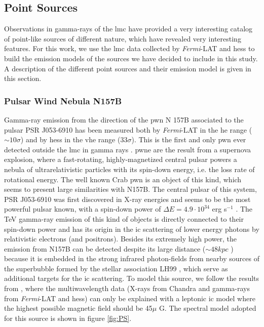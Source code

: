 \documentclass[main.tex]{subfiles}
\begin{document}
\subsection{Point Sources}

Observations in gamma-rays of the \gls{lmc} have provided a very interesting catalog of point-like sources of different nature, which have revealed very interesting features. For this work, we use the \gls{lmc} data collected by \textit{Fermi}-LAT \cite{2010FermiLATLMC11months} \cite{2016LMCFermiLAT} and \gls{hess} \cite{2012HESSLMC} \cite{2015HESSTeVLMC} \cite{2017HESSLMCP3} to build the emission models of the sources we have decided to include in this study. A description of the different point sources and their emission model is given in this section.

\subsubsection{Pulsar Wind Nebula N157B}

Gamma-ray emission from the direction of the \gls{pwn} N 157B associated to the pulsar  PSR J053-6910 has been measured both by \textit{Fermi}-LAT in the \gls{he} range ($\sim 10 \sigma$) and by \gls{hess} in the \gls{vhe} range ($33 \sigma$). This is the first and only \gls{pwn} ever detected outside the \gls{lmc} in gamma rays \cite{2012HESSN157B}. \gls{pwne} are the result from  a supernova explosion, where a fast-rotating, highly-magnetized central pulsar powers a nebula of ultrarelativistic particles with its spin-down energy, i.e. the loss rate of rotational energy. The well known Crab \gls{pwn} is an object of this kind, which seems to present large similarities with N157B. The central pulsar of this system, PSR J053-6910 was first discovered in X-ray energies and seems to be the most powerful pulsar known, with a spin-down power of $\Delta E = 4.9 \cdot 10^{34} $ erg s$^{-1}$ \cite{1998PulsarN157B}. The TeV gamma-ray emission of this kind of objects is directly connected to their spin-down power and has its origin in the \gls{ic} scattering of lower energy photons by relativistic electrons (and positrons). Besides its extremely high power, the emission from N157B can be detected despite its large distance ($\sim 48 kpc$ \cite{2006N157Bdistance}) because it is embedded in the strong infrared photon-fields from nearby sources of the superbubble formed by the stellar association LH99 \cite{}, which serve as additional targets for the \gls{ic} scattering.
To model this source, we follow the results from \cite{2015HESSTeVLMC}, where the multiwavelength data (X-rays from Chandra \cite{2001ChandraN157B} and gamma-rays from \textit{Fermi}-LAT and \gls{hess}) can only be explained with a leptonic \gls{ic} model where the highest possible magnetic field should be 45$\mu$ G. The  spectral model adopted for this source is shown in figure \ref{fig:PS}.
\end{document}
